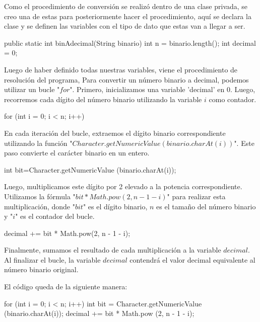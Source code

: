\documentclass{IEEEcsmag}
\begin{document}
Como el procedimiento de conversión se realizó dentro de una clase privada, se creo una de estas para posteriormente hacer el procedimiento, aquí se declara la clase y se definen las variables con el tipo de dato que estas van a llegar a ser.

\begin{javaCode}
public static int binAdecimal(String binario){
    int n = binario.length();
    int decimal = 0;
    }
\end{javaCode}

Luego de haber definido todas nuestras variables, viene el procedimiento de resolución del programa, Para convertir un número binario a decimal, podemos utilizar un bucle "$for$". Primero, inicializamos una variable 'decimal' en 0. Luego, recorremos cada dígito del número binario utilizando la variable $i$ como contador.

\begin{javaCode}
    for (int i = 0; i < n; i++) {
    }
\end{javaCode}

En cada iteración del bucle, extraemos el dígito binario correspondiente utilizando la función "$Character.getNumericValue(binario.charAt(i))$". Este paso convierte el carácter binario en un entero.

\begin{javaCode}
    int bit=Character.getNumericValue
        (binario.charAt(i));
\end{javaCode}

Luego, multiplicamos este dígito por 2 elevado a la potencia correspondiente. Utilizamos la fórmula "$bit * Math.pow(2, n - 1 - i)$" para realizar esta multiplicación, donde "$bit$" es el dígito binario, $n$ es el tamaño del número binario y "$i$" es el contador del bucle.

\begin{javaCode}
decimal += bit * Math.pow(2, n - 1 - i);
\end{javaCode}

Finalmente, sumamos el resultado de cada multiplicación a la variable $decimal$.
Al finalizar el bucle, la variable $decimal$ contendrá el valor decimal equivalente al número binario original.

El código queda de la siguiente manera:
\begin{javaCode}
    for (int i = 0; i < n; i++) {
    int bit = Character.getNumericValue
    (binario.charAt(i));
    decimal += bit * Math.pow
    (2, n - 1 - i);
    }
\end{javaCode}
\end{document}
